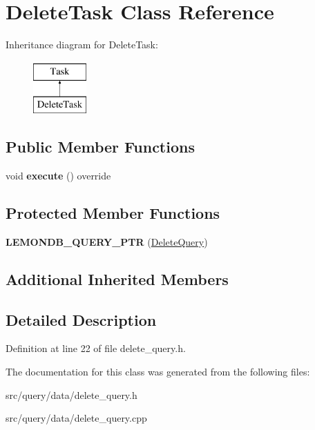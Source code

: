\hypertarget{class_delete_task}{}\section{Delete\+Task Class Reference}
\label{class_delete_task}
Inheritance diagram for Delete\+Task\+:\begin{figure}[H]
\begin{center}
\leavevmode
\includegraphics[height=2.000000cm]{class_delete_task}
\end{center}
\end{figure}
\subsection*{Public Member Functions}
\begin{DoxyCompactItemize}
\item 
\mbox{\label{class_delete_task_a5f9ca85f1fcc0cb0fa8f88379aec97a3}} 
void {\bfseries execute} () override
\end{DoxyCompactItemize}
\subsection*{Protected Member Functions}
\begin{DoxyCompactItemize}
\item 
\mbox{\label{class_delete_task_ad01f73fd1fc4af6261d78ff70e6b5e76}} 
{\bfseries L\+E\+M\+O\+N\+D\+B\+\_\+\+Q\+U\+E\+R\+Y\+\_\+\+P\+TR} (\hyperlink{class_delete_query}{Delete\+Query})
\end{DoxyCompactItemize}
\subsection*{Additional Inherited Members}


\subsection{Detailed Description}


Definition at line 22 of file delete\+\_\+query.\+h.



The documentation for this class was generated from the following files\+:\begin{DoxyCompactItemize}
\item 
src/query/data/delete\+\_\+query.\+h\item 
src/query/data/delete\+\_\+query.\+cpp\end{DoxyCompactItemize}
